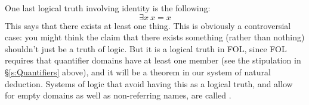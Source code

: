 One last logical truth involving identity is the following:
$$\exists x \ x=x$$
This says that there exists at least one thing. This is obviously a controversial case: you might think the claim that there exists something (rather than nothing) shouldn't just be a truth of logic.  But it is a logical truth in FOL, since FOL requires that quantifier domains have at least one member (see the stipulation in \S \ref{s:Quantifiers} above), and it will be a theorem in our system of natural deduction.  Systems of logic that avoid having this as a logical truth, and allow for empty domains as well as non-referring names, are called .

\practiceproblems




